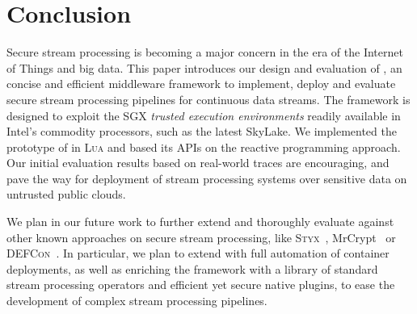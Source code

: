 \section{Conclusion}
\label{sec:conclusion}

Secure stream processing is becoming a major concern in the era of the Internet of Things and big data.
This paper introduces our design and evaluation of \SYS{}, an concise and efficient middleware framework to implement, deploy and evaluate secure stream processing pipelines for continuous data streams.
The framework is designed to exploit the SGX \emph{trusted execution environments} readily available in Intel{\textregistered}'s commodity processors, such as the latest SkyLake.
We implemented the prototype of \SYS{} in \textsc{Lua} and based its APIs on the reactive programming approach.
Our initial evaluation results based on real-world traces are encouraging, and pave the way for deployment of stream processing systems over sensitive data on untrusted public clouds.

We plan in our future work to further extend and thoroughly evaluate \SYS against other known approaches on secure stream processing, like \textsc{Styx}~\cite{Stephen:2016:SSP:2987550.2987574}, MrCrypt~\cite{tetali2013mrcrypt} or \textsc{DEFCon}~\cite{Migliavacca:2010:DHE}.
In particular, we plan to extend \SYS with full automation of container deployments, as well as enriching the framework with a library of standard stream processing operators and efficient yet secure native plugins, to ease the development of complex stream processing pipelines.
